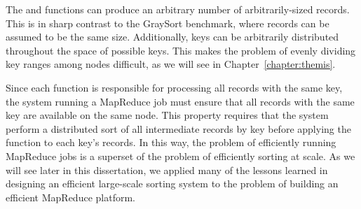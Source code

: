 The \map and \reduce functions can produce an arbitrary number of
arbitrarily-sized records. This is in sharp contrast to the GraySort benchmark,
where records can be assumed to be the same size. Additionally, keys can be
arbitrarily distributed throughout the space of possible keys. This makes the
problem of evenly dividing key ranges among nodes difficult, as we will see in
Chapter~\ref{chapter:themis}.

Since each \reduce function is responsible for processing all records with the
same key, the system running a MapReduce job must ensure that all records with
the same key are available on the same node. This property requires that the
system perform a distributed sort of all intermediate records by key before
applying the \reduce function to each key's records. In this way, the problem
of efficiently running MapReduce jobs is a superset of the problem of
efficiently sorting at scale. As we will see later in this dissertation, we
applied many of the lessons learned in designing an efficient large-scale
sorting system to the problem of building an efficient MapReduce platform.
